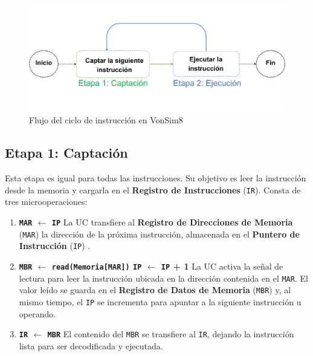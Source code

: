 \documentclass[12pt,oneside]{templates/unerthesis}
\begin{document}
\begin{figure}

{\centering \includegraphics[width=1\linewidth]{images/cicloinstruccion3} 

}

\caption{Flujo del ciclo de instrucción en VonSim8}\label{fig:flujoCicloInstruccion}
\end{figure}

\hypertarget{etapa-1-captaciuxf3n}{%
\subsection{Etapa 1: Captación}\label{etapa-1-captaciuxf3n}}

Esta etapa es igual para todas las instrucciones. Su objetivo es leer la instrucción desde la memoria y cargarla en el \textbf{Registro de Instrucciones} (\texttt{IR}). Consta de tres microoperaciones:

\begin{enumerate}
\def\labelenumi{\arabic{enumi}.}
\item
  \textbf{\texttt{MAR} \(\leftarrow\) \texttt{IP}}
  La UC transfiere al \textbf{Registro de Direcciones de Memoria} (\texttt{MAR}) la dirección de la próxima instrucción, almacenada en el \textbf{Puntero de Instrucción} (\texttt{IP}) .
\item
  \textbf{\texttt{MBR} \(\leftarrow\) \texttt{read(Memoria{[}MAR{]})} \textbar{} \texttt{IP} \(\leftarrow\) \texttt{IP} + 1}
  La UC activa la señal de lectura para leer la instrucción ubicada en la dirección contenida en el \texttt{MAR}. El valor leído se guarda en el \textbf{Registro de Datos de Memoria} (\texttt{MBR}) y, al mismo tiempo, el \texttt{IP} se incrementa para apuntar a la siguiente instrucción u operando.
\item
  \textbf{\texttt{IR} \(\leftarrow\) \texttt{MBR}}
  El contenido del \texttt{MBR} se transfiere al \texttt{IR}, dejando la instrucción lista para ser decodificada y ejecutada.
\end{enumerate}
\end{document}
